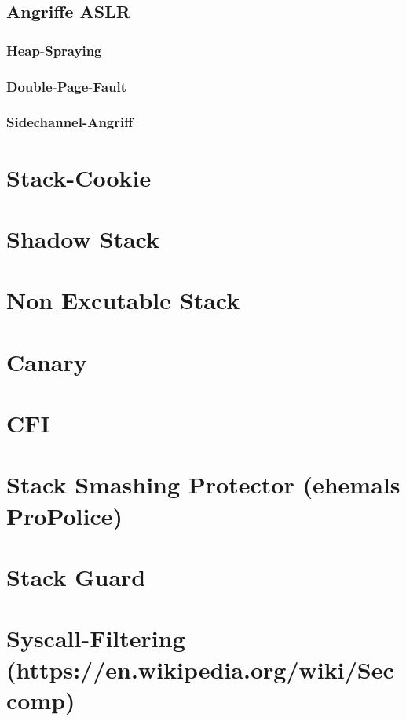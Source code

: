 \documentclass[12pt]{book}
\begin{document}
\subsection{Angriffe ASLR}

\subsubsection{Heap-Spraying}

\subsubsection{Double-Page-Fault}

\subsubsection{Sidechannel-Angriff}

\section{Stack-Cookie}

\section{Shadow Stack}

\section{Non Excutable Stack}

\section{Canary}

\section{CFI}

\section{Stack Smashing Protector (ehemals ProPolice)}

\section{Stack Guard}

\section{Syscall-Filtering (https://en.wikipedia.org/wiki/Seccomp)}
\end{document}
